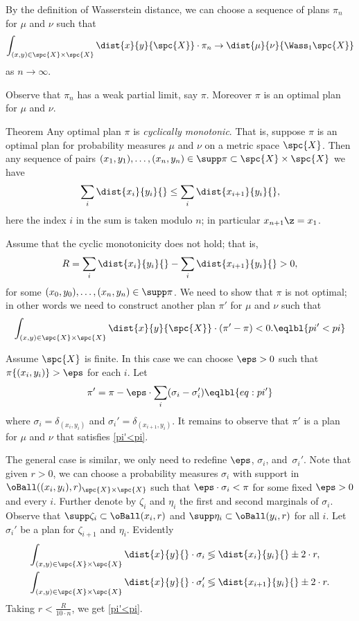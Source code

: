 By the definition of Wasserstein distance, we can choose a sequence of plans $\pi_n$ for $\mu$ and $\nu$ such that 
\[\int_{(x,y)\in\spc{X}\times\spc{X}}\dist{x}{y}{\spc{X}}\cdot\pi_n\to \dist{\mu}{\nu}{\Wass_1\spc{X}}\]
as $n\to \infty$.

Observe that $\pi_n$ has a weak partial limit, say $\pi$.
Moreover $\pi$ is an optimal plan for $\mu$ and $\nu$.
\qeds

\begin{thm}{Theorem}
Any optimal plan $\pi$ is \emph{cyclically monotonic}.
That is, suppose $\pi$ is an optimal plan for probability measures $\mu$ and $\nu$ on a metric space $\spc{X}$.
Then any sequence of pairs $(x_1,y_1),\dots,(x_n,y_n)\in\supp\pi\subset\spc{X}\times\spc{X}$ we have
\[\sum_i\dist{x_i}{y_i}{}
\le
\sum_i\dist{x_{i+1}}{y_i}{},\]
here the index $i$ in the sum is taken modulo $n$; in particular $x_{n+1}\z=x_1$.
\end{thm}

Assume that the cyclic monotonicity does not hold;
that is,
\[R=\sum_i\dist{x_i}{y_i}{}
-
\sum_i\dist{x_{i+1}}{y_i}{}>0,\]
for some $(x_0,y_0),\dots,(x_n,y_n)\in\supp\pi$.
We need to show that $\pi$ is not optimal;
in other words we need to construct another plan $\pi'$ for $\mu$ and $\nu$ such that 
\[\int_{(x,y)\in\spc{X}\times\spc{X}}\dist{x}{y}{\spc{X}}\cdot(\pi'-\pi)<0.\eqlbl{pi'<pi}\]

Assume $\spc{X}$ is finite.
In this case we can choose $\eps>0$ such that 
$\pi\{(x_i,y_i)\}>\eps$ for each $i$.
Let
\[\pi'=\pi-\eps\cdot\sum_i(\sigma_i-\sigma_i')\eqlbl{eq:pi'}\]
where $\sigma_i=\delta_{(x_i,y_i)}$ and $\sigma_i'=\delta_{(x_{i+1},y_i)}$.
It remains to observe that $\pi'$ is a plan for $\mu$ and $\nu$ that satisfies \ref{pi'<pi}.

The general case is similar, we only need to redefine $\eps$, $\sigma_i$, and~$\sigma_i'$.
Note that given $r>0$, we can choose a probability measures $\sigma_i$ with support in $\oBall((x_i,y_i),r)_{\spc{X}\times\spc{X}}$ such that $\eps\cdot \sigma_i<\pi$ for some fixed $\eps>0$ and every $i$.
Further denote by $\zeta_i$ and $\eta_i$ the first and second marginals of $\sigma_i$.
Observe that $\supp\zeta_i\subset\oBall(x_i,r)$ and $\supp\eta_i\subset\oBall(y_i,r)$ for all $i$.
Let $\sigma_i'$ be a plan for $\zeta_{i+1}$ and $\eta_i$.
Evidently 
\begin{align*}
\int_{(x,y)\in\spc{X}\times\spc{X}}\dist{x}{y}{}\cdot \sigma_i
&\lessgtr
\dist{x_i}{y_i}{}\pm 2\cdot r,
\\
\int_{(x,y)\in\spc{X}\times\spc{X}}\dist{x}{y}{}\cdot \sigma_i'
&\lessgtr
\dist{x_{i+1}}{y_i}{}\pm 2\cdot r.
\end{align*}
Taking $r<\tfrac R{10\cdot n}$, we get  \ref{pi'<pi}. 
\qeds





